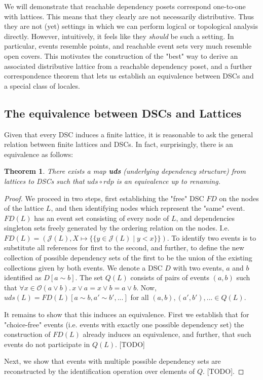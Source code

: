 \documentclass[hoptionsi,review,format=acmsmall]{acmart}
\newtheorem{theorem}{Theorem}[section]
\theoremstyle{definition}
\newcommand{\Oc}{\mathcal{O}}
\newcommand{\Jc}{\mathcal{J}}
\begin{document}
We will demonstrate that reachable dependency posets correspond one-to-one with lattices. This means that they clearly are not necessarily distributive. Thus they are not (yet) settings in which we can perform logical or topological analysis directly. However, intuitively, it feels like they \textit{should} be such a setting. In particular, events resemble points, and reachable event sets very much resemble open covers. This motivates the construction of the "best" way to derive an associated distributive lattice from a reachable dependency poset, and a further correspondence theorem that lets us establish an equivalence between DSCs and a special class of locales.

\subsection{The equivalence between DSCs and Lattices}
Given that every DSC induces a finite lattice, it is reasonable to ask the general relation between finite lattices and DSCs. In fact, surprisingly, there is an equivalence as follows:

\begin{theorem}
There exists a map \textbf{uds} (underlying dependency structure) from lattices to DSCs such that \(uds \circ rdp\) is an equivalence up to renaming.
\end{theorem}
\begin{proof}
We proceed in two steps, first establishing the "free" DSC \(FD\) on the nodes of the lattice \(L\), and then identifying nodes which represent the "same" event. \(FD(L)\) has an event set consisting of every node of \(L\), and dependencies singleton sets freely generated by the ordering relation on the nodes.  I.e. \(FD(L) = (\Jc(L), X \mapsto \{\{ y \in \Jc(L) \mid y<x\}\})\). To identify two events is to substitute all references for first to the second, and further, to define the new collection of possible dependency sets of the first to be the union of the existing collections given by both events. We denote a DSC \(D\) with two events, \(a\) and \(b\) identified as  \(D[a\sim b]\). The set \(Q(L)\) consists of pairs of events \((a,b)\) such that  \(\forall x \in \Oc(a \vee b). \, x \vee a = x \vee b = a \vee b\).  Now, \(uds(L) = FD(L)[a \sim b,a' \sim b',...]\) for all \((a,b), (a',b'), ...\in Q(L)\).

It remains to show that this induces an equivalence. First we establish that for "choice-free" events (i.e. events with exactly one possible dependency set) the construction of \(FD(L)\) already induces an equivalence, and further, that such events do not participate in \(Q(L)\). [TODO]

Next, we show that events with multiple possible dependency sets are reconstructed by the identification operation over elements of \(Q\). [TODO].
\end{proof}
\end{document}
